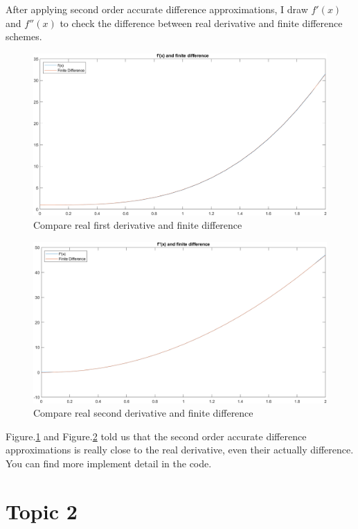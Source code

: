 \documentclass[
	12pt, %
]{fphw}
\numberwithin{equation}{section}
\numberwithin{figure}{section}
\numberwithin{table}{section}
\begin{document}
After applying second order accurate difference approximations, I draw $f'(x)$ and $f''(x)$ to check the difference between real derivative and finite difference schemes.

\begin{figure}[h!]
	\centering
	\includegraphics[width=0.8\columnwidth]{img/f'(x).png} %
	\caption{Compare real first derivative and finite difference}
	\label{fig:f'(x)}
\end{figure}

\begin{figure}[h!]
	\centering
	\includegraphics[width=0.8\columnwidth]{img/f''(x).png} %
	\caption{Compare real second derivative and finite difference}
	\label{fig:f''(x)}
\end{figure}


Figure.\ref{fig:f'(x)} and Figure.\ref{fig:f''(x)} told us that the second order accurate difference approximations is really close to the real derivative, even their actually difference. You can find more implement detail in the code.


\section{Topic 2}
\end{document}
